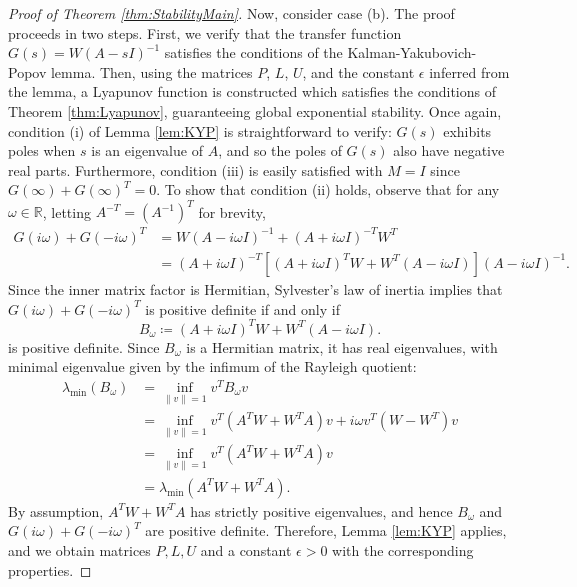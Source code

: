 \documentclass{article} \usepackage{iclr2021_conference,times}
\begin{document}
\begin{proof}[Proof of Theorem \ref{thm:StabilityMain}]
Now, consider case (b). The proof proceeds in two steps. First, we verify that the transfer function $G(s) = W(A - sI)^{-1}$ satisfies the conditions of the Kalman-Yakubovich-Popov lemma. Then, using the matrices $P$, $L$, $U$, and the constant $\epsilon$ inferred from the lemma, a Lyapunov function is constructed which satisfies the conditions of Theorem \ref{thm:Lyapunov}, guaranteeing global exponential stability. Once again, condition (i) of Lemma \ref{lem:KYP} is straightforward to verify: $G(s)$ exhibits poles when $s$ is an eigenvalue of $A$, and so the poles of $G(s)$ also have negative real parts. Furthermore, condition (iii) is easily satisfied with $M = I$ since $G(\infty)+G(\infty)^T = 0$. To show that condition (ii) holds, observe that for any $\omega \in \mathbb{R}$, letting $A^{-T} = (A^{-1})^T$ for brevity,
\begin{align*}
G(i\omega) + G(-i\omega)^T &= W(A - i\omega I)^{-1} + (A + i\omega I)^{-T} W^T \\
&= (A + i\omega I)^{-T} [(A+i\omega I)^T W + W^T (A - i\omega I)](A - i\omega I)^{-1}.
\end{align*}
Since the inner matrix factor is Hermitian, Sylvester's law of inertia implies that $G(i\omega) + G(-i\omega)^T$ is positive definite if and only if 
\[
B_\omega \coloneqq (A + i\omega I)^T W + W^T (A - i\omega I).
\]
is positive definite. Since $B_\omega$ is a Hermitian matrix, it has real eigenvalues, with minimal eigenvalue given by the infimum of the Rayleigh quotient:
\begin{align*}
\lambda_{\min}(B_\omega) &= \inf_{\|v\| = 1} v^T B_\omega v \\
&= \inf_{\|v\| = 1} v^T (A^T W + W^T A)v + i\omega v^T(W - W^T) v \\
&= \inf_{\|v\| = 1} v^T (A^T W + W^T A)v \\
&= \lambda_{\min}(A^T W + W^T A).
\end{align*}
By assumption, $A^T W + W^T A$ has strictly positive eigenvalues, and hence $B_\omega$ and $G(i\omega) + G(-i\omega)^T$ are positive definite. Therefore, Lemma \ref{lem:KYP} applies, and we obtain matrices $P,L,U$ and a constant $\epsilon > 0$ with the corresponding properties.


\end{proof}
\end{document}
